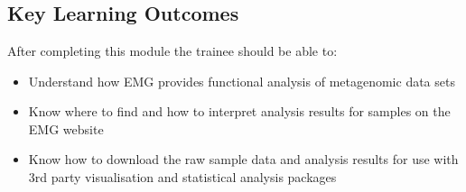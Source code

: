 

\chapter{\moduleTitle}
\newpage



\section{Key Learning Outcomes}

After completing this module the trainee should be able to:
\begin{itemize}
  \item Understand how EMG provides functional analysis of metagenomic data sets
  \item Know where to find and how to interpret analysis results for samples on the EMG website
  \item Know how to download the raw sample data and analysis results for use with 3rd party visualisation and statistical analysis packages
\end{itemize}


